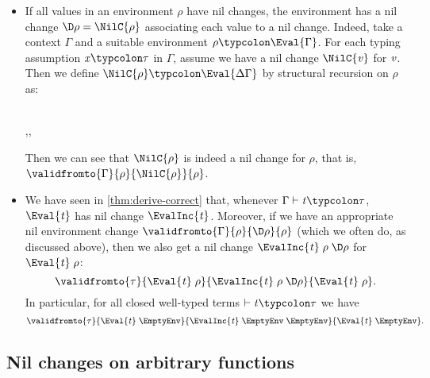 \begin{examples}
\begin{itemize}
\item If all values in an environment \ensuremath{\rho} have nil changes,
the environment has a nil change \ensuremath{\D\rho\mathrel{=}\NilC{\rho}} associating
each value to a nil change. Indeed, take a context \ensuremath{\Gamma} and a
suitable environment \ensuremath{\rho\typcolon\Eval{\Gamma}}. For each typing
assumption \ensuremath{\Varid{x}\typcolon\tau} in \ensuremath{\Gamma}, assume we have a nil change \ensuremath{\NilC{\Varid{v}}} for \ensuremath{\Varid{v}}. Then we define \ensuremath{\NilC{\rho}\typcolon\Eval{\Delta \Gamma}} by
structural recursion on \ensuremath{\rho} as:
\begin{hscode}\SaveRestoreHook
{}%
%
%
\>[3]{}\NilC{\EmptyEnv}\mathrel{=}\EmptyEnv{}\<[E]%
\\
\>[3]{}\mathrel{=}\NilC{\rho},\mathrel{=},\mathrel{=}\<[E]%
\ColumnHook
\end{hscode}\resethooks
Then we can see that \ensuremath{\NilC{\rho}} is indeed a nil change for \ensuremath{\rho},
that is, \ensuremath{\validfromto{\Gamma}{\rho}{\NilC{\rho}}{\rho}}.
\item We have seen in \cref{thm:derive-correct} that, whenever
  \ensuremath{\Gamma\vdash\Varid{t}\typcolon\tau}, \ensuremath{\Eval{\Varid{t}}} has nil change \ensuremath{\EvalInc{\Varid{t}}}.
  Moreover, if we have an appropriate nil environment change
  \ensuremath{\validfromto{\Gamma}{\rho}{\D\rho}{\rho}} (which we often do, as discussed
  above), then we also get a nil change \ensuremath{\EvalInc{\Varid{t}}\;\rho\;\D\rho} for
  \ensuremath{\Eval{\Varid{t}}\;\rho}:
\[\ensuremath{\validfromto{\tau}{\Eval{\Varid{t}}\;\rho}{\EvalInc{\Varid{t}}\;\rho\;\D\rho}{\Eval{\Varid{t}}\;\rho}}.\]
In particular, for all closed well-typed terms \ensuremath{\vdash\Varid{t}\typcolon\tau} we have
\[\ensuremath{\validfromto{\tau}{\Eval{\Varid{t}}\;\EmptyEnv}{\EvalInc{\Varid{t}}\;\EmptyEnv\;\EmptyEnv}{\Eval{\Varid{t}}\;\EmptyEnv}}.\]
\end{itemize}
\end{examples}

\subsection{Nil changes on arbitrary functions}
\label{sec:nil-changes-fun-intro}

